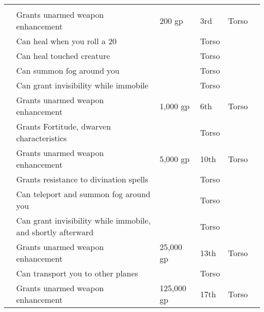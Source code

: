 \begin{longtabuwrapper}
\begin{longtabu}{l X l l l l}
                \midrule
                 &  &  &  &  &  \\
                  & Grants  unarmed weapon enhancement & 200 gp & 3rd & Torso &  \\
                 & Can heal when you roll a 20 &  & Torso &  \\
                 & Can heal touched creature &  & Torso &  \\
                 & Can summon fog around you &  & Torso &  \\
                 & Can grant invisibility while immobile &  & Torso &  \\
                  & Grants  unarmed weapon enhancement & 1,000 gp & 6th & Torso &  \\
                 & Grants  Fortitude, dwarven characteristics &  & Torso &  \\
                  & Grants  unarmed weapon enhancement & 5,000 gp & 10th & Torso &  \\
                 & Grants resistance to divination spells &  & Torso &  \\
                 & Can teleport and summon fog around you &  & Torso &  \\
                 & Can grant invisibility while immobile, and shortly afterward  &  & Torso &  \\
                  & Grants  unarmed weapon enhancement & 25,000 gp & 13th & Torso &  \\
                 & Can transport you to other planes &  & Torso &  \\
                  & Grants  unarmed weapon enhancement & 125,000 gp & 17th & Torso &  \\
            \end{longtabu}
        \end{longtabuwrapper}
        \twocolumn

